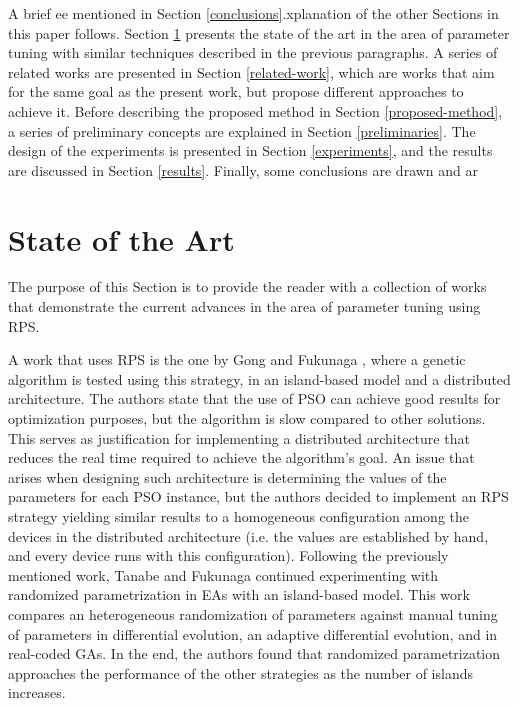 

A brief ee mentioned in Section \ref{conclusions}.xplanation of the other Sections in this paper follows. Section \ref{state-of-the-art} presents the state of the art in the area of parameter tuning with similar techniques described in the previous paragraphs. A series of related works are presented in Section \ref{related-work}, which are works that aim for the same goal as the present work, but propose different approaches to achieve it. Before describing the proposed method in Section \ref{proposed-method}, a series of preliminary concepts are explained in Section \ref{preliminaries}. The design of the experiments is presented in Section \ref{experiments}, and the results are discussed in Section \ref{results}. Finally, some conclusions are drawn and ar

\section{State of the Art}
\label{state-of-the-art}

The purpose of this Section is to provide the reader with a collection of works that demonstrate the current advances in the area of parameter tuning using RPS.

A work that uses RPS is the one by Gong and Fukunaga \cite{gong2011distributed}, where a genetic algorithm is tested using this strategy, in an island-based model and a distributed architecture. The authors state that the use of PSO can achieve good results for optimization purposes, but the algorithm is slow compared to other solutions.%
This serves as justification for implementing a distributed architecture that reduces the real time required to achieve the algorithm's goal. An issue that arises when designing such architecture is determining the values of the parameters for each PSO instance, but the authors decided to implement an RPS strategy yielding similar results to a homogeneous configuration among the devices in the distributed architecture (i.e. the values are established by hand, and every device runs with this configuration). Following the previously mentioned work, Tanabe and Fukunaga \cite{tanabe2013evaluation} continued experimenting with randomized parametrization in EAs with an island-based model. This work compares an heterogeneous randomization of parameters against manual tuning of parameters in differential evolution, an adaptive differential evolution, and in real-coded GAs. In the end, the authors found that randomized parametrization approaches the performance of the other strategies as the number of islands increases.

